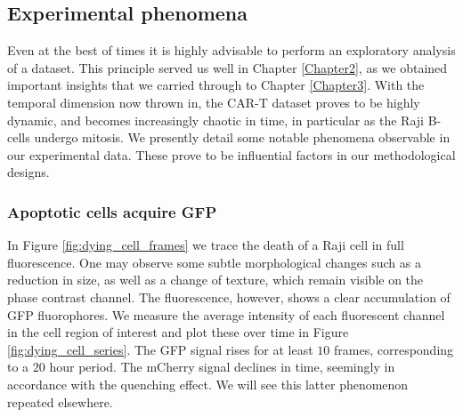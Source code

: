 \subsection{Experimental phenomena}
\label{subsec:phenomena}

Even at the best of times it is highly advisable to perform an exploratory analysis of a dataset. This principle served us well in Chapter \ref{Chapter2}, as we obtained important insights that we carried through to Chapter \ref{Chapter3}. With the temporal dimension now thrown in, the CAR-T dataset proves to be highly dynamic, and becomes increasingly chaotic in time, in particular as the Raji B-cells undergo mitosis. We presently detail some notable phenomena observable in our experimental data. These prove to be influential factors in our methodological designs.

\subsubsection{Apoptotic cells acquire GFP}

In Figure \ref{fig:dying_cell_frames} we trace the death of a Raji cell in full fluorescence. One may observe some subtle morphological changes such as a reduction in size, as well as a change of texture, which remain visible on the phase contrast channel. The fluorescence, however, shows a clear accumulation of GFP fluorophores. We measure the average intensity of each fluorescent channel in the cell region of interest and plot these over time in Figure \ref{fig:dying_cell_series}. The GFP signal rises for at least $10$ frames, corresponding to a $20$ hour period. The mCherry signal declines in time, seemingly in accordance with the quenching effect. We will see this latter phenomenon repeated elsewhere.

%

